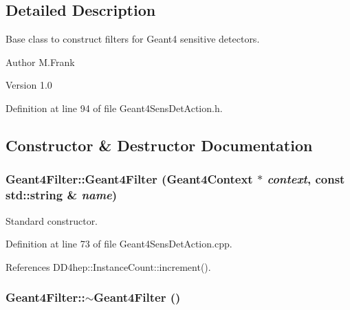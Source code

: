 \subsection{Detailed Description}
Base class to construct filters for Geant4 sensitive detectors. \begin{DoxyAuthor}{Author}
M.Frank 
\end{DoxyAuthor}
\begin{DoxyVersion}{Version}
1.0 
\end{DoxyVersion}


Definition at line 94 of file Geant4SensDetAction.h.

\subsection{Constructor \& Destructor Documentation}
\hypertarget{class_d_d4hep_1_1_simulation_1_1_geant4_filter_a9473fedf4d296dd044a9310a9da57bb4}{
\subsubsection[{Geant4Filter}]{\setlength{\rightskip}{0pt plus 5cm}Geant4Filter::Geant4Filter ({\bf Geant4Context} $\ast$ {\em context}, \/  const std::string \& {\em name})}}
\label{class_d_d4hep_1_1_simulation_1_1_geant4_filter_a9473fedf4d296dd044a9310a9da57bb4}


Standard constructor. 

Definition at line 73 of file Geant4SensDetAction.cpp.

References DD4hep::InstanceCount::increment().\hypertarget{class_d_d4hep_1_1_simulation_1_1_geant4_filter_a2fdb09d7018165b25034b37fa8eb9930}{
\subsubsection[{$\sim$Geant4Filter}]{\setlength{\rightskip}{0pt plus 5cm}Geant4Filter::$\sim$Geant4Filter ()}}
\label{class_d_d4hep_1_1_simulation_1_1_geant4_filter_a2fdb09d7018165b25034b37fa8eb9930}


